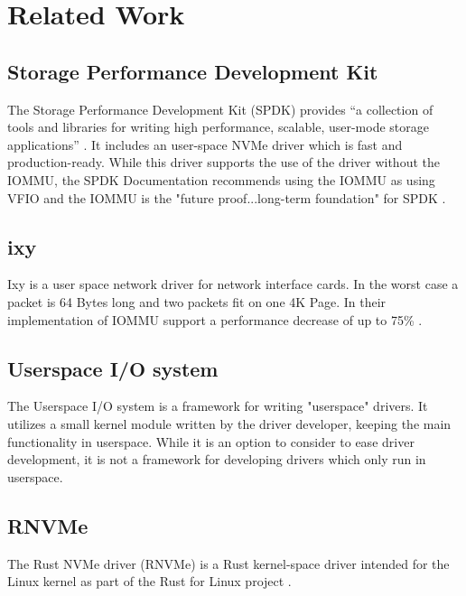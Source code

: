 \chapter{Related Work}

\section{Storage Performance Development Kit}
The Storage Performance Development Kit (SPDK) provides ``a collection of tools and libraries for writing high performance, scalable, user-mode storage applications'' \cite{spdkindex}. It includes an user-space NVMe driver which is fast and production-ready. While this driver supports the use of the driver without the IOMMU, the SPDK Documentation recommends using the IOMMU as using VFIO and the IOMMU is the "future proof...long-term foundation" for SPDK \cite{spdkmemory}.

\section{ixy} \label{s:ixy}
Ixy is a user space network driver for network interface cards. In the worst case a packet is 64 Bytes long and two packets fit on one 4K Page. In their implementation of IOMMU support a performance decrease of up to 75\% \cite{iommuhuber}.

\section{Userspace I/O system}
The Userspace I/O system is a framework for writing "userspace" drivers. It utilizes a small kernel module written by the driver developer, keeping the main functionality in userspace. While it is an option to consider to ease driver development, it is not a framework for developing drivers which only run in userspace.

\section{RNVMe}
The Rust NVMe driver (RNVMe) is a Rust kernel-space driver intended for the Linux kernel as part of the Rust for Linux project \cite{rnvmedriver}.